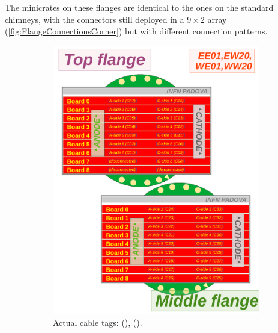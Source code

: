 The minicrates on these flanges are identical to the ones on the standard chimneys,
with the connectors still deployed in a $9 \times 2$ array
(\cref{fig:FlangeConnectionsCorner})
but with different connection patterns.

\begin{figure}
  \begin{subfigure}{0.45\linewidth}
    \includegraphics[width=\textwidth]{figures/CornerFlangesAndMinicrate_upward}
    \caption{Actual cable tags:  (),  ().}
    \label{fig:FlangeConnectionsCorner_upward}
  \end{subfigure}
  \begin{subfigure}{0.45\linewidth}

\end{subfigure}
\end{figure}
